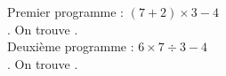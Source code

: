    Premier programme : {\blue $(7 + 2)\times3-4$} \\ [1mm]
   . On trouve {}. \\
   Deuxième programme :  {\blue $6\times7\div3-4$} \\ [1mm]
   . On trouve {}.
